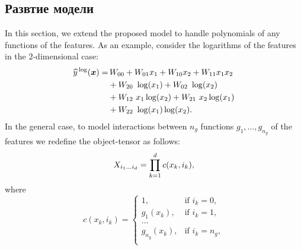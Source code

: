 
\subsection{Развтие модели \label{sec:exm-model-extension}}
In this section, we extend the proposed model to handle polynomials of any functions of the features.
As an example, consider the logarithms of the features in the $2$-dimensional case:
\begin{equation*}
  \begin{aligned}
    \widehat{y}^{\,\log}(\boldsymbol{x}) =& \,W_{00} + W_{01} x_1 +W_{10} x_2 + W_{11} x_1 x_2\\
    &+W_{20} \,\, \log(x_1) + W_{02} \,\, \log(x_2)\\
    &+ W_{12} \,\, x_1 \log(x_2)+ W_{21} \,\, x_2 \log(x_1)\\
    &+ W_{22} \,\, \log(x_1) \log(x_2).
  \end{aligned}
\end{equation*}
In the general case, to model interactions between $n_g$ functions $g_1, \ldots, g_{n_g}$ of the features we redefine the object-tensor as follows:
\begin{equation*}
X_{i_1 \ldots i_d} = \prod_{k=1}^d c(x_k, i_k),
\end{equation*}
where
\begin{equation*}
c(x_k, i_k) =
\begin{cases}
1, & \text{if } i_k = 0,\\
g_1(x_k), & \text{if } i_k = 1,\\
\ldots\\
g_{n_g}(x_k), & \text{if } i_k = n_g,\\
\end{cases}
\end{equation*}


